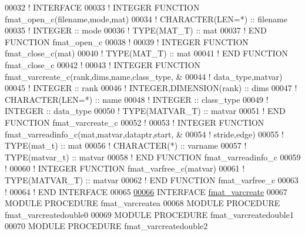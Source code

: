 \begin{DoxyCode}
00032 \textcolor{comment}{!    INTERFACE}
00033 \textcolor{comment}{!        INTEGER FUNCTION fmat\_open\_c(filename,mode,mat)}
00034 \textcolor{comment}{!            CHARACTER(LEN=*) :: filename}
00035 \textcolor{comment}{!            INTEGER          :: mode}
00036 \textcolor{comment}{!            TYPE(MAT\_T)      :: mat}
00037 \textcolor{comment}{!        END FUNCTION fmat\_open\_c}
00038 \textcolor{comment}{!}
00039 \textcolor{comment}{!        INTEGER FUNCTION fmat\_close\_c(mat)}
00040 \textcolor{comment}{!            TYPE(MAT\_T) :: mat}
00041 \textcolor{comment}{!        END FUNCTION fmat\_close\_c}
00042 \textcolor{comment}{!}
00043 \textcolor{comment}{!        INTEGER FUNCTION fmat\_varcreate\_c(rank,dims,name,class\_type,      &}
00044 \textcolor{comment}{!                                          data\_type,matvar)}
00045 \textcolor{comment}{!            INTEGER                 :: rank}
00046 \textcolor{comment}{!            INTEGER,DIMENSION(rank) :: dims}
00047 \textcolor{comment}{!            CHARACTER(LEN=*)        :: name}
00048 \textcolor{comment}{!            INTEGER                 :: class\_type}
00049 \textcolor{comment}{!            INTEGER                 :: data\_type}
00050 \textcolor{comment}{!            TYPE(MATVAR\_T)          :: matvar}
00051 \textcolor{comment}{!        END FUNCTION fmat\_varcreate\_c}
00052 \textcolor{comment}{!}
00053 \textcolor{comment}{!        INTEGER FUNCTION fmat\_varreadinfo\_c(mat,matvar,dataptr,start,     &}
00054 \textcolor{comment}{!                                            stride,edge)}
00055 \textcolor{comment}{!            TYPE(mat\_t)     :: mat}
00056 \textcolor{comment}{!            CHARACTER(*)    :: varname}
00057 \textcolor{comment}{!            TYPE(matvar\_t)  :: matvar}
00058 \textcolor{comment}{!        END FUNCTION fmat\_varreadinfo\_c}
00059 \textcolor{comment}{!}
00060 \textcolor{comment}{!        INTEGER FUNCTION fmat\_varfree\_c(matvar)}
00061 \textcolor{comment}{!            TYPE(MATVAR\_T) :: matvar}
00062 \textcolor{comment}{!        END FUNCTION fmat\_varfree\_c}
00063 \textcolor{comment}{!}
00064 \textcolor{comment}{!    END INTERFACE}
00065 
\hyperlink{interfacematio_1_1fmat__varcreate}{00066}     \textcolor{keyword}{INTERFACE} \hyperlink{interfacematio_1_1fmat__varcreate}{fmat\_varcreate}
00067         \textcolor{keyword}{MODULE PROCEDURE} fmat\_varcreatea
00068         \textcolor{keyword}{MODULE PROCEDURE} fmat\_varcreatedouble0
00069         \textcolor{keyword}{MODULE PROCEDURE} fmat\_varcreatedouble1
00070         \textcolor{keyword}{MODULE PROCEDURE} fmat\_varcreatedouble2

\end{DoxyCode}
